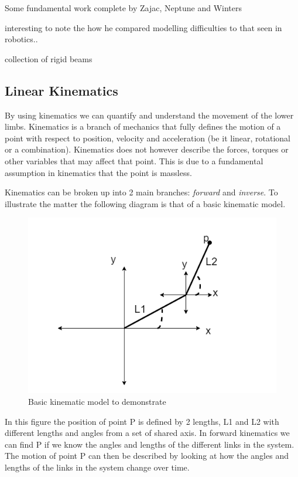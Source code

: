 Some fundamental work complete by Zajac, Neptune and Winters

\cite{zajac1990modeling} 
interesting to note the how he compared modelling difficulties to that seen in robotics..

\cite{zajac2002biomechanics}


\cite{zajac2003biomechanics}


collection of rigid beams


\subsection{Linear Kinematics}
By using kinematics we can quantify and understand the movement of the lower limbs. Kinematics is a branch of mechanics that fully defines the motion of a point with respect to position, velocity and acceleration (be it linear, rotational or a combination). Kinematics does not however describe the forces, torques or other variables that may affect that point. This is due to a fundamental assumption in kinematics that the point is massless.	 

Kinematics can be broken up into 2 main branches: \textit{forward} and \textit{inverse}. To illustrate the matter the following diagram is that of a basic kinematic model.

\begin{figure}[!ht] 
\captionsetup{width=\linewidth, font=small}  
\includegraphics[width=\linewidth]{figures/kinematics.png}
\caption{Basic kinematic model to demonstrate}
\label{fig:kinematics}
\end{figure}

In this figure the position of point P is defined by 2 lengths, L1 and L2 with different lengths and angles from a set of shared axis. In forward kinematics we can find P if we know the angles and lengths of the different links in the system. The motion of point P can then be described by looking at  how the angles and lengths of the links in the system change over time.

